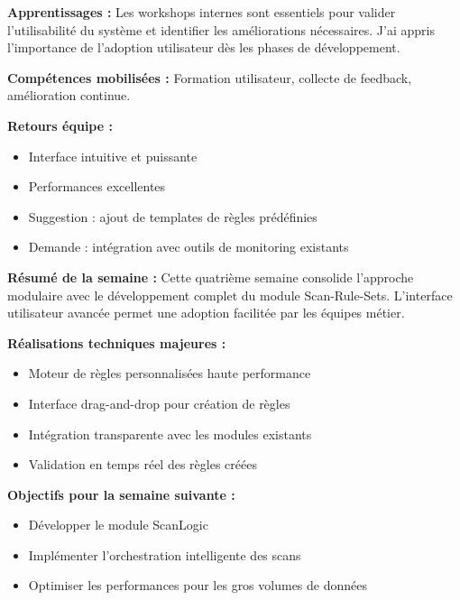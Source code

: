 \textbf{Apprentissages :}
Les workshops internes sont essentiels pour valider l'utilisabilité du système et identifier les améliorations nécessaires. J'ai appris l'importance de l'adoption utilisateur dès les phases de développement.

\textbf{Compétences mobilisées :}
Formation utilisateur, collecte de feedback, amélioration continue.

\textbf{Retours équipe :}
\begin{itemize}
    \item Interface intuitive et puissante
    \item Performances excellentes
    \item Suggestion : ajout de templates de règles prédéfinies
    \item Demande : intégration avec outils de monitoring existants
\end{itemize}

\textbf{Résumé de la semaine :}
Cette quatrième semaine consolide l'approche modulaire avec le développement complet du module Scan-Rule-Sets. L'interface utilisateur avancée permet une adoption facilitée par les équipes métier.

\textbf{Réalisations techniques majeures :}
\begin{itemize}
    \item Moteur de règles personnalisées haute performance
    \item Interface drag-and-drop pour création de règles
    \item Intégration transparente avec les modules existants
    \item Validation en temps réel des règles créées
\end{itemize}

\textbf{Objectifs pour la semaine suivante :}
\begin{itemize}
    \item Développer le module ScanLogic
    \item Implémenter l'orchestration intelligente des scans
    \item Optimiser les performances pour les gros volumes de données
\end{itemize}